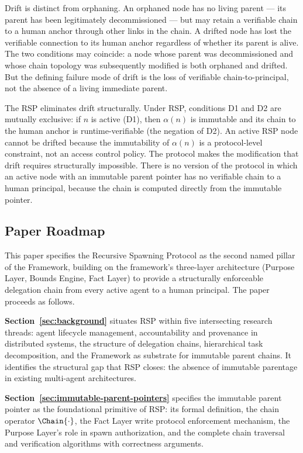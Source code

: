 Drift is distinct from orphaning. An orphaned node has no living parent — its parent has been legitimately decommissioned — but may retain a verifiable chain to a human anchor through other links in the chain. A drifted node has lost the verifiable connection to its human anchor regardless of whether its parent is alive. The two conditions may coincide: a node whose parent was decommissioned and whose chain topology was subsequently modified is both orphaned and drifted. But the defining failure mode of drift is the loss of verifiable chain-to-principal, not the absence of a living immediate parent.

The RSP eliminates drift structurally. Under RSP, conditions D1 and D2 are mutually exclusive: if $n$ is active (D1), then $\alpha(n)$ is immutable and its chain to the human anchor is runtime-verifiable (the negation of D2). An active RSP node cannot be drifted because the immutability of $\alpha(n)$ is a protocol-level constraint, not an access control policy. The protocol makes the modification that drift requires structurally impossible. There is no version of the protocol in which an active node with an immutable parent pointer has no verifiable chain to a human principal, because the chain is computed directly from the immutable pointer.

\subsection{Paper Roadmap}
\label{sec:roadmap}

This paper specifies the Recursive Spawning Protocol as the second named pillar of the \bxthree{} Framework, building on the framework's three-layer architecture (Purpose Layer, Bounds Engine, Fact Layer) to provide a structurally enforceable delegation chain from every active agent to a human principal. The paper proceeds as follows.

\textbf{Section~\ref{sec:background}} situates RSP within five intersecting research threads: agent lifecycle management, accountability and provenance in distributed systems, the structure of delegation chains, hierarchical task decomposition, and the \bxthree{} Framework as substrate for immutable parent chains. It identifies the structural gap that RSP closes: the absence of immutable parentage in existing multi-agent architectures.

\textbf{Section~\ref{sec:immutable-parent-pointers}} specifies the immutable parent pointer as the foundational primitive of RSP: its formal definition, the chain operator $\Chain{\cdot}$, the Fact Layer write protocol enforcement mechanism, the Purpose Layer's role in spawn authorization, and the complete chain traversal and verification algorithms with correctness arguments.

